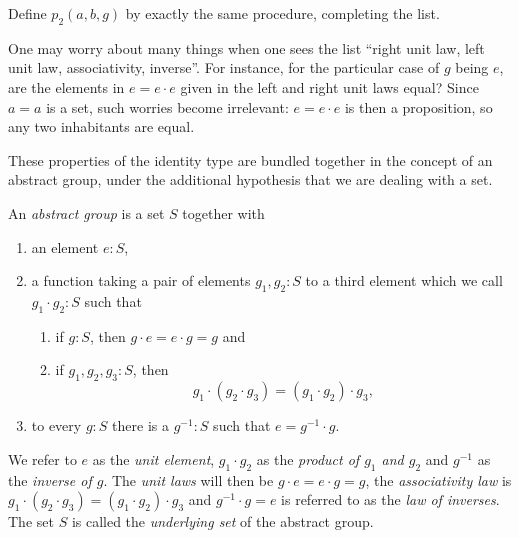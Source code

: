 \begin{xca}\label{xca:p2}
    Define $p_2(a,b,g)$ %
by exactly the same procedure, completing the list.
\end{xca}

\begin{remark}
   One may worry about many things when one sees the list ``right unit law, left unit law, associativity, inverse''.  For instance, for the particular case of $g$ being $e$, are the elements in $e=e\cdot e$ given in the left and right unit laws equal?  Since $a=a$ is a set, such worries become irrelevant: $e=e\cdot e$ is then a proposition, so any two inhabitants are equal.
 \end{remark}

These properties of the identity type are bundled together in the concept of an abstract group, under the additional hypothesis that we are dealing with a set.

  \begin{definition}\label{def:abstractgroup}
    An \emph{abstract group} is a set $S$ together with
\begin{enumerate}
\item an element $e:S$,
\item a function taking a pair of elements $g_1,g_2:S$ to a third element which we call $g_1\cdot g_2:S$ such that
  \begin{enumerate}
  \item %
if $g:S$, then $g\cdot e=e\cdot g=g$ and
  \item %
if $g_1,g_2,g_3:S$, then
$$g_1\cdot(g_2\cdot g_3)=(g_1\cdot g_2)\cdot g_3,$$
  \end{enumerate}
\item %
to every $g:S$ there is a $g^{-1}:S$ such that $%
e=g^{-1}\cdot g$.
\end{enumerate}
We refer to $e$ as the \emph{unit element}, $g_1\cdot g_2$ as the \emph{product of $g_1$ and $g_2$} and $g^{-1}$ as the \emph{inverse of $g$}.  The \emph{unit laws} will then be $g\cdot e=e\cdot g=g$, the \emph{associativity law} is $g_1\cdot(g_2\cdot g_3)=(g_1\cdot g_2)\cdot g_3$ and $%
g^{-1}\cdot g=e$ is referred to as the \emph{law of inverses}.  The set $S$ is called the \emph{underlying set} of the abstract group.
  \end{definition}

